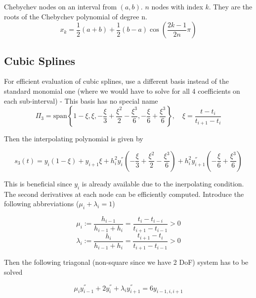 \documentclass[
    a4paper,
    11pt
]{article}
\begin{document}
Chebychev nodes on an interval from $(a,b)$. $n$ nodes with index $k$. They are
the roots of the Chebychev polynomial of degree n.
\begin{equation}
    x_k = \frac{1}{2}(a+b) + \frac{1}{2}(b-a)\cos(\frac{2k-1}{2n}\pi)
\end{equation}

\subsection{Cubic Splines}

For efficient evaluation of cubic splines, use a different basis instead of the
standard monomial one (where we would have to solve for all 4 coefficients on
each sub-interval) - This basis has no special name
\begin{equation}
    \Pi_3 = \text{span}\left\{
        1 - \xi,
        \xi,
        -\frac{\xi}{3}+\frac{\xi^2}{2}-\frac{\xi^3}{6},
        -\frac{\xi}{6} + \frac{\xi^3}{6}
    \right\}, \quad \xi = \frac{t-t_i}{t_{i+1} - t_i}
\end{equation}

Then the interpolating polynomial is given by

\begin{equation}
    s_3(t) = y_i(1-\xi) + y_{i+1}\xi + h_i^2 y_i^{''} \left( -\frac{\xi}{3} +
    \frac{\xi^2}{2} - \frac{\xi^3}{6} \right) + h_i^2 y_{i+1}^{''} \left(
    -\frac{\xi}{6} + \frac{\xi^3}{6} \right)
\end{equation}

This is beneficial since $y_i$ is already available due to the inerpolating
condition. The second derivatives at each node can be efficiently computed.
Introduce the following abbreviations ($\mu_i + \lambda_i =1$)

\begin{equation}
    \mu_i := \frac{h_{i-1}}{h_{i-1} + h_i} = \frac{t_i -t_{i-i}}{t_{i+1} -
    t_{i-1}} > 0
\end{equation}
\begin{equation}
    \lambda_i := \frac{h_i}{h_{i-1} + h_i} = \frac{t_{i+1} - t_i}{t_{i+1} -
    t_{i-1}} > 0
\end{equation}

Then the following triagonal (non-square since we have 2 DoF) system has to be
solved

\begin{equation}
    \mu_i y_{i-1}^{''} + 2y_i^{''} + \lambda_i y_{i+1}^{''} = 6 y_{i-1,i,i+1}
\end{equation}
\end{document}
